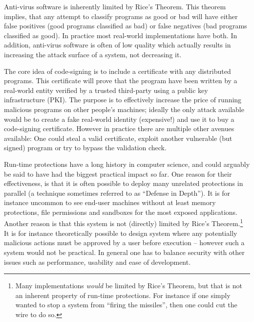 Anti-virus software is inherently limited by Rice's Theorem. This theorem
implies, that any attempt to classify programs as good or bad will have either
false positives (good programs classified as bad) or false negatives (bad
programs classified as good). In practice most real-world implementations have
both. In addition, anti-virus software is often of low quality which actually
results in increasing the attack surface of a system, not decreasing
it.

The core idea of code-signing is to include a certificate with any distributed
programs. This certificate will prove that the program have been written by a
real-world entity verified by a trusted third-party using a public key
infrastructure (PKI). The purpose is to effectively increase the price of
running malicious programs on other people's machines; ideally the only attack
available would be to create a fake real-world identity (expensive!) and use it
to buy a code-signing certificate. However in practice there are multiple other
avenues available: One could steal a valid certificate, exploit another
vulnerable (but signed) program or try to bypass the validation check.

Run-time protections have a long history in computer science, and could arguably
be said to have had the biggest practical impact so far. One reason for their
effectiveness, is that it is often possible to deploy many unrelated protections
in parallel (a technique sometimes referred to as ``Defense in Depth''). It is
for instance uncommon to see end-user machines without at least memory
protections, file permissions and sandboxes for the most exposed
applications. Another reason is that this system is not (directly) limited by
Rice's Theorem.\footnote{Many implementations \emph{would} be limited by Rice's
  Theorem, but that is not an inherent property of run-time protections. For
  instance if one simply wanted to stop a system from ``firing the missiles'',
  then one could cut the wire to do so.} It is for instance theoretically
possible to design system where any potentially malicious actions must be
approved by a user before execution -- however such a system would not be
practical. In general one has to balance security with other issues such as
performance, usability and ease of development.

